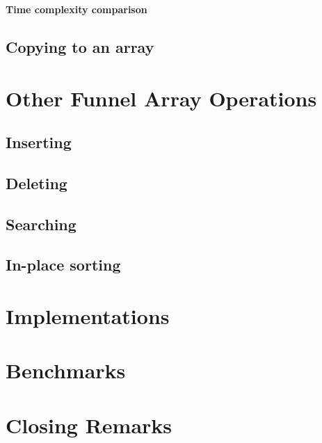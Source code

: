 \documentclass{article}
\newcommand{\tcomplexcmp}{\textbf{Time complexity comparison}}
\begin{document}
	\tcomplexcmp
	
	\subsection{Copying to an array}
	
	\section{Other Funnel Array Operations}
	
	\subsection{Inserting}
	
	\subsection{Deleting}
	
	\subsection{Searching}
	
	\subsection{In-place sorting}
	
	\section{Implementations}
	
	\section{Benchmarks}
	
	\section{Closing Remarks}
\end{document}
